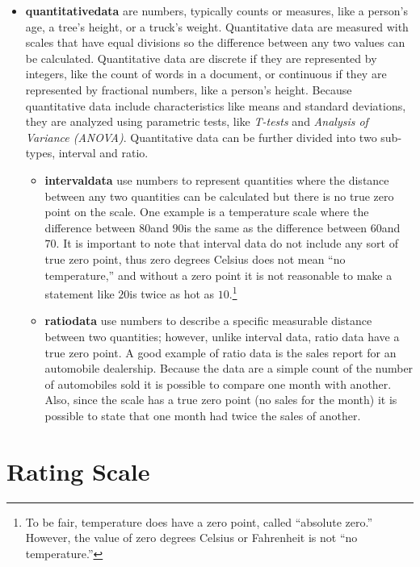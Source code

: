 \begin{itemize}
	\item \textbf{\Gls{quantitativedata}} are numbers, typically counts or measures, like a person's age, a tree's height, or a truck's weight. Quantitative data are measured with scales that have equal divisions so the difference between any two values can be calculated. Quantitative data are discrete if they are represented by integers, like the count of words in a document, or continuous if they are represented by fractional numbers, like a person's height. Because quantitative data include characteristics like means and standard deviations, they are analyzed using parametric tests, like \textit{T-tests} and \textit{Analysis of Variance (ANOVA)}. Quantitative data can be further divided into two sub-types, interval and ratio.
	
	\begin{itemize}
		\item \textbf{\Gls{intervaldata}} use numbers to represent quantities where the distance between any two quantities can be calculated but there is no true zero point on the scale. One example is a temperature scale where the difference between $ 80 $\textdegree and $ 90 $\textdegree is the same as the difference between $ 60 $\textdegree and $ 70 $\textdegree. It is important to note that interval data do not include any sort of true zero point, thus zero degrees Celsius does not mean ``no temperature,'' and without a zero point it is not reasonable to make a statement like $ 20 $\textdegree is twice as hot as $ 10 $\textdegree.\footnote{To be fair, temperature does have a zero point, called ``absolute zero.'' However, the value of zero degrees Celsius or Fahrenheit is not ``no temperature.''}
		
		\item \textbf{\Gls{ratiodata}} use numbers to describe a specific measurable distance between two quantities; however, unlike interval data, ratio data have a true zero point. A good example of ratio data is the sales report for an automobile dealership. Because the data are a simple count of the number of automobiles sold it is possible to compare one month with another. Also, since the scale has a true zero point (no sales for the month) it is possible to state that one month had twice the sales of another.
	\end{itemize}
\end{itemize}

\section{Rating Scale}


